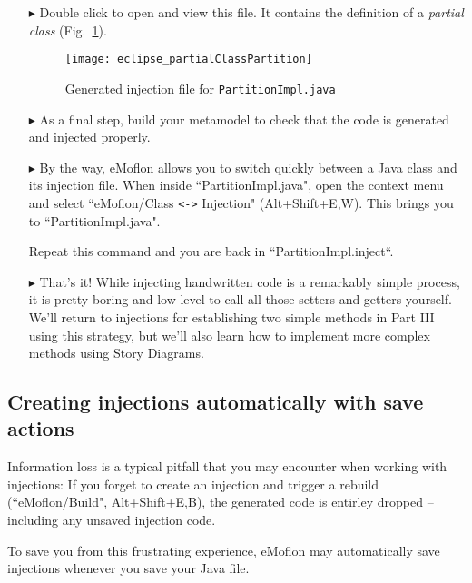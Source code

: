 \begin{itemize}
\item[$\blacktriangleright$] Double click to open and view this file. It contains the definition of a \textit{partial class}
(Fig.~\ref{eclipse:injection_partialClassPartition}).

\begin{figure}[htbp]
    \centering
    \texttt{[image: eclipse\_partialClassPartition]}
    \caption{Generated injection file for \texttt{PartitionImpl.java}}
    \label{eclipse:injection_partialClassPartition}
\end{figure}

\clearpage

\item[$\blacktriangleright$] As a final step, build your metamodel to check that the code is generated and injected properly.

\item[$\blacktriangleright$] By the way, eMoflon allows you to switch quickly between a Java class and its injection file.
When inside ``PartitionImpl.java", open the context menu and select ``eMoflon/Class \verb|<->| Injection" (Alt+Shift+E,W).
This brings you to ``PartitionImpl.java".

Repeat this command and you are back in ``PartitionImpl.inject``.


\item[$\blacktriangleright$] That's it! While injecting handwritten code is a remarkably simple process, it is pretty boring and low level to call all those
setters and getters yourself. We'll return to injections for establishing two simple methods in Part III using this strategy, but we'll also learn how to
implement more complex methods using Story Diagrams.
 
\end{itemize}

\subsection*{Creating injections automatically with save actions}

Information loss is a typical pitfall that you may encounter when working with injections:
If you forget to create an injection and trigger a rebuild (``eMoflon/Build", Alt+Shift+E,B), the generated code is entirley dropped -- including any unsaved injection code.

To save you from this frustrating experience, eMoflon may automatically save injections whenever you save your Java file.

